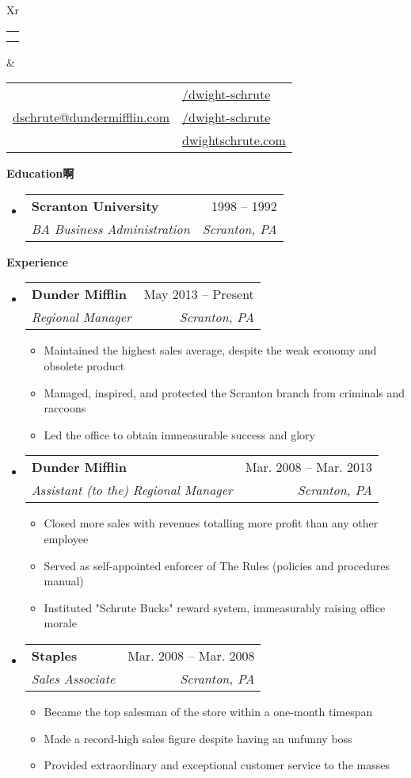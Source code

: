 \documentclass[letterpaper,12pt]{article}[leftmargin=*]
\makeatletter
\def \fullname {Dwight Schrute}
\def \subtitle {}
\def \linkedinicon {\faLinkedin}
\def \linkedinlink {https://linkedin.com/in/dwight-schrute/}
\def \linkedintext {/dwight-schrute}
\def \phoneicon {\faPhone}
\def \phonetext {+1-123-456-7890}
\def \emailicon {\faEnvelope}
\def \emaillink {mailto:dschrute@dundermifflin.com}
\def \emailtext {dschrute@dundermifflin.com}
\def \githubicon {\faGithub}
\def \githublink {https://github.com/dwight-schrute}
\def \githubtext {/dwight-schrute}
\def \websiteicon {\faGlobe}
\def \websitelink {https://google.com/}
\def \websitetext {dwightschrute.com}
\def \headertype {\doublecol} %
\def \entryspacing {-0pt}
\def \linkedin {\linkedinicon \hspace{3pt}\href{\linkedinlink}{\linkedintext}}
\def \phone {\phoneicon \hspace{3pt}{ \phonetext}}
\def \email {\emailicon \hspace{3pt}\href{\emaillink}{\emailtext}}
\def \github {\githubicon \hspace{3pt}\href{\githublink}{\githubtext}}
\def \website {\websiteicon \hspace{3pt}\href{\websitelink}{\websitetext}}
\renewcommand{\section}[2]{\vspace{5pt}
	\colorbox{secondary}{\color{white}\raggedbottom\normalsize\textbf{{#1}{\hspace{7pt}#2}}}
}
\newcommand{\resumeEntryStart}{\begin{itemize}[leftmargin=2.5mm]}
\newcommand{\resumeEntryEnd}{\end{itemize}\vspace{\entryspacing}}
\newcommand{\resumeItemListStart}{\begin{itemize}[leftmargin=4.5mm]}
\newcommand{\resumeItemListEnd}{\end{itemize}}
\newcommand{\resumeItem}[1]{
	\item\small{
		{#1 \vspace{-2pt}}
	}
}
\newcommand{\resumeEntryTSDL}[4]{
	\vspace{-1pt}\item[]
	\begin{tabularx}{0.97\textwidth}{X@{\hspace{60pt}}r}
		\textbf{\color{primary}#1} & {\firabook\color{accent}\small#2} \\
		\textit{\color{accent}\small#3} & \textit{\color{accent}\small#4} \\
	\end{tabularx}\vspace{-6pt}
}
\newcommand{\doublecol}[6]{
	\begin{tabularx}{\textwidth}{Xr}
		{
			\begin{tabular}[c]{l}
				\fontsize{35}{45}\selectfont{\color{primary}{{\textbf{\fullname}}}} \\
				{\textit{\subtitle}} %
			\end{tabular}
		} & {
			\begin{tabular}[c]{l@{\hspace{1.5em}}l}
				{\small#4} & {\small#1} \\
				{\small#5} & {\small#2} \\
				{\small#6} & {\small#3}
			\end{tabular}
		}
	\end{tabularx}
}
\newcommand{\singlecol}[6]{
	\begin{tabularx}{\textwidth}{Xr}
		{
			\begin{tabular}[b]{l}
				\fontsize{35}{45}\selectfont{\color{primary}{{\textbf{\fullname}}}} \\
				{\textit{\subtitle}} %
			\end{tabular}
		} & {
			\begin{tabular}[c]{l}
				{\small#1} \\
				{\small#2} \\
				{\small#3} \\
				{\small#4} \\
				{\small#5} \\
				{\small#6}
			\end{tabular}
		}
	\end{tabularx}
}
\makeatother
\begin{document}
	
	
	\headertype{\linkedin}{\github}{\website}{\phone}{\email}{} %
	\vspace{-10pt} %
	
	\section{\faGraduationCap}{Education啊}
	
	\resumeEntryStart
	\resumeEntryTSDL
	{Scranton University}{1998 -- 1992}
	{BA Business Administration}{Scranton, PA}
	\resumeEntryEnd
	
	\section{\faPieChart}{Experience}
	
	\resumeEntryStart
	\resumeEntryTSDL
	{Dunder Mifflin}{May 2013 -- Present}
	{Regional Manager}{Scranton, PA}
	\resumeItemListStart
	\resumeItem {Maintained the highest sales average, despite the weak economy and obsolete product}
	\resumeItem {Managed, inspired, and protected the Scranton branch from criminals and raccoons}
	\resumeItem {Led the office to obtain immeasurable success and glory}
	\resumeItemListEnd
	\resumeEntryEnd
	
	\resumeEntryStart
	\resumeEntryTSDL
	{Dunder Mifflin}{Mar. 2008 -- Mar. 2013}
	{Assistant (to the) Regional Manager}{Scranton, PA}
	\resumeItemListStart
	\resumeItem {Closed more sales with revenues totalling more profit than any other employee}
	\resumeItem {Served as self-appointed enforcer of The Rules (policies and procedures manual)}
	\resumeItem {Instituted "Schrute Bucks" reward system, immeasurably raising office morale}
	\resumeItemListEnd
	\resumeEntryEnd
	
	\resumeEntryStart
	\resumeEntryTSDL
	{Staples}{Mar. 2008 -- Mar. 2008}
	{Sales Associate}{Scranton, PA}
	\resumeItemListStart
	\resumeItem {Became the top salesman of the store within a one-month timespan}
	\resumeItem {Made a record-high sales figure despite having an unfunny boss}
	\resumeItem {Provided extraordinary and exceptional customer service to the masses}
	\resumeItemListEnd
	\resumeEntryEnd
	
\end{document}
